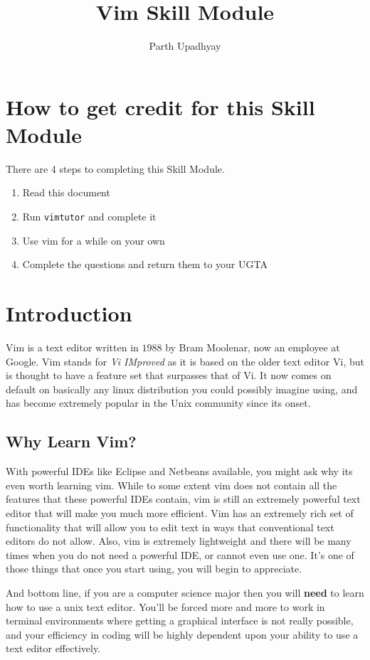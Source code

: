 

\title{Vim Skill Module}
\author{Parth Upadhyay}
\date{}


\maketitle

\section{How to get credit for this Skill Module}
There are 4 steps to completing this Skill Module.
\begin{enumerate}
\item Read this document
\item Run \texttt{vimtutor} and complete it
\item Use vim for a while on your own
\item Complete the questions and return them to your UGTA
\end{enumerate}

\section{Introduction}
Vim is a text editor written in $1988$ by Bram Moolenar, now an
employee at Google. Vim stands for {\em Vi IMproved} as it is based
on the older text editor Vi, but is thought to have a feature set
that surpasses that of Vi. It now comes on default on basically any
linux distribution you could possibly imagine using, and has become
extremely popular in the Unix community since its onset. 

\subsection{Why Learn Vim?}
With powerful IDEs like Eclipse and Netbeans available, you might ask why
its even worth learning vim. While to some extent vim does not contain
all the features that these powerful IDEs contain, vim is still an 
extremely powerful text editor that will make you much more efficient.
Vim has an extremely rich set of functionality that will allow you to 
edit text in ways that conventional text editors do not allow. Also,
vim is extremely lightweight and there will be many times when you
do not need a powerful IDE, or cannot even use one. It's one of those
things that once you start using, you will begin to appreciate.

And bottom line, if you are a computer science major then you will {\bf need}
to learn how to use a unix text editor. You'll be forced more and more
to work in terminal environments where getting a graphical interface is not
really possible, and your efficiency in coding will be highly dependent
upon your ability to use a text editor effectively.

